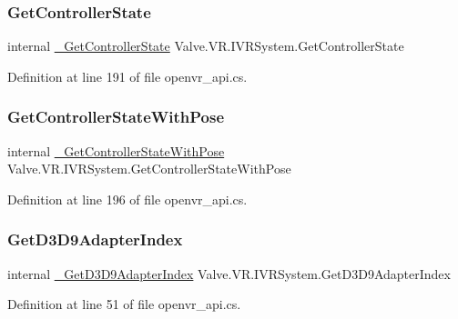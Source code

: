 \subsubsection{\texorpdfstring{GetControllerState}{GetControllerState}}
{\footnotesize\ttfamily internal \mbox{\hyperlink{struct_valve_1_1_v_r_1_1_i_v_r_system_a1eca77760e6464488c6ca3e083e0a456}{\+\_\+\+Get\+Controller\+State}} Valve.\+V\+R.\+I\+V\+R\+System.\+Get\+Controller\+State}



Definition at line 191 of file openvr\+\_\+api.\+cs.

\mbox{\label{struct_valve_1_1_v_r_1_1_i_v_r_system_a95719e013581d2bc69b8ac13230f9926}} 
\subsubsection{\texorpdfstring{GetControllerStateWithPose}{GetControllerStateWithPose}}
{\footnotesize\ttfamily internal \mbox{\hyperlink{struct_valve_1_1_v_r_1_1_i_v_r_system_ad69cca720213c448e77167bb46b1a804}{\+\_\+\+Get\+Controller\+State\+With\+Pose}} Valve.\+V\+R.\+I\+V\+R\+System.\+Get\+Controller\+State\+With\+Pose}



Definition at line 196 of file openvr\+\_\+api.\+cs.

\mbox{\label{struct_valve_1_1_v_r_1_1_i_v_r_system_a1f85e448984efdb948ab539fcf4446c2}} 
\subsubsection{\texorpdfstring{GetD3D9AdapterIndex}{GetD3D9AdapterIndex}}
{\footnotesize\ttfamily internal \mbox{\hyperlink{struct_valve_1_1_v_r_1_1_i_v_r_system_af8628eb30b5b12b64585d57ebc093ff9}{\+\_\+\+Get\+D3\+D9\+Adapter\+Index}} Valve.\+V\+R.\+I\+V\+R\+System.\+Get\+D3\+D9\+Adapter\+Index}



Definition at line 51 of file openvr\+\_\+api.\+cs.

